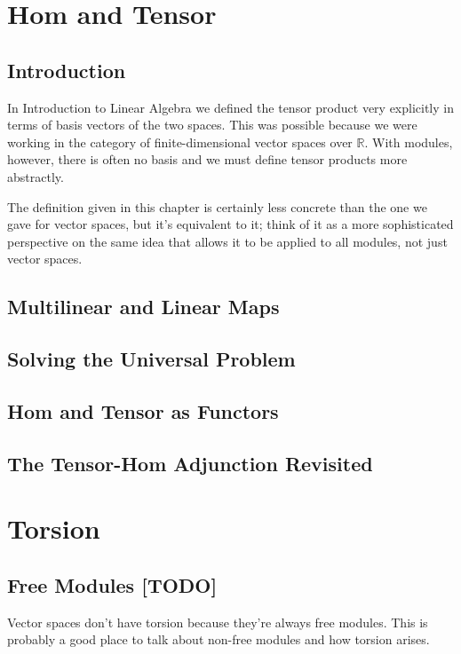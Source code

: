\documentclass[oneside,english]{amsbook}
\numberwithin{section}{chapter}
\theoremstyle{plain}
\theoremstyle{definition}
\begin{document}
	\chapter{Hom and Tensor}
	
		\section{Introduction}

			In Introduction to Linear Algebra we defined the tensor product very explicitly in terms of basis vectors of the two spaces. This was possible because we were working in the category of finite-dimensional vector spaces over $\mathbb{R}$. With modules, however, there is often no basis and we must define tensor products more abstractly.
			
			The definition given in this chapter is certainly less concrete than the one we gave for vector spaces, but it's equivalent to it; think of it as a more sophisticated perspective on the same idea that allows it to be applied to all modules, not just vector spaces.
			
		\section{Multilinear and Linear Maps}
		
		\section{Solving the Universal Problem}

		\section{Hom and Tensor as Functors}

		\section{The Tensor-Hom Adjunction Revisited}


	\chapter{Torsion}
		
		\section{Free Modules [TODO]}
			
			Vector spaces don't have torsion because they're always free modules. This is probably a good place to talk about non-free modules and how torsion arises.
			
\end{document}
